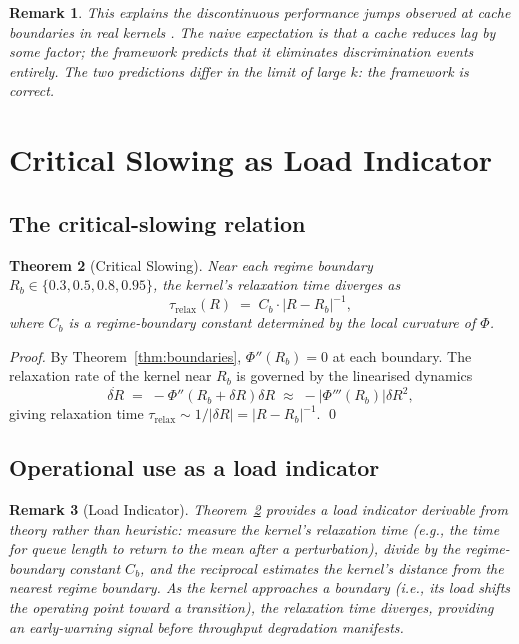 \documentclass[twocolumn,11pt,a4paper]{article}
\newtheorem{theorem}{Theorem}[section]
\newtheorem{remark}[theorem]{Remark}
\newcommand{\Rens}{R}
\begin{document}
\begin{remark}
This explains the discontinuous performance jumps observed at cache boundaries in real kernels \citep{smith1982cache,hennessy2017computer}. The naive expectation is that a cache reduces lag by some factor; the framework predicts that it eliminates discrimination events entirely. The two predictions differ in the limit of large $k$: the framework is correct.
\end{remark}

\section{Critical Slowing as Load Indicator}
\label{sec:critical}

\subsection{The critical-slowing relation}

\begin{theorem}[Critical Slowing]
\label{thm:critical}
Near each regime boundary $\Rens_b \in \{0.3, 0.5, 0.8, 0.95\}$, the kernel's relaxation time diverges as
\[
\tau_\mathrm{relax}(\Rens) \;=\; C_b \cdot |\Rens - \Rens_b|^{-1},
\]
where $C_b$ is a regime-boundary constant determined by the local curvature of $\Phi$.
\end{theorem}

\begin{proof}
By Theorem~\ref{thm:boundaries}, $\Phi''(\Rens_b) = 0$ at each boundary. The relaxation rate of the kernel near $\Rens_b$ is governed by the linearised dynamics
\[
\dot{\delta\Rens} \;=\; -\Phi''(\Rens_b + \delta\Rens) \delta\Rens \;\approx\; -|\Phi'''(\Rens_b)| \delta\Rens^2,
\]
giving relaxation time $\tau_\mathrm{relax} \sim 1/|\delta\Rens| = |\Rens - \Rens_b|^{-1}$. \qed
\end{proof}

\subsection{Operational use as a load indicator}

\begin{remark}[Load Indicator]
\label{rem:load-indicator}
Theorem~\ref{thm:critical} provides a load indicator derivable from theory rather than heuristic: measure the kernel's relaxation time (e.g., the time for queue length to return to the mean after a perturbation), divide by the regime-boundary constant $C_b$, and the reciprocal estimates the kernel's distance from the nearest regime boundary. As the kernel approaches a boundary (i.e., its load shifts the operating point toward a transition), the relaxation time diverges, providing an early-warning signal before throughput degradation manifests.
\end{remark}
\end{document}
